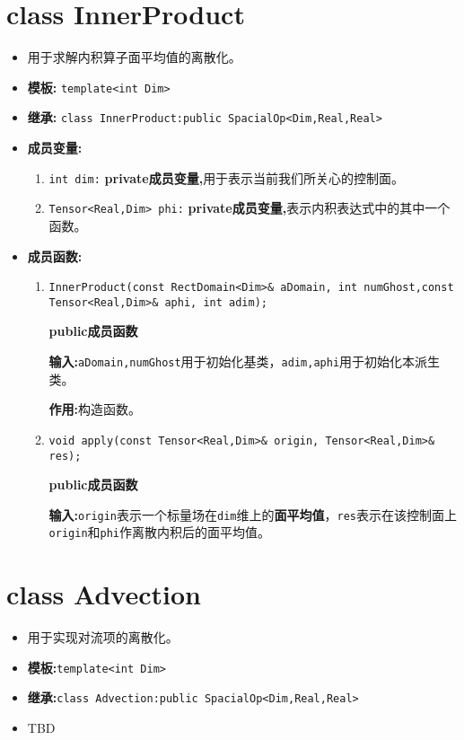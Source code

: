\documentclass[UTF8]{ctexart}
\theoremstyle{plain}
\theoremstyle{definition}
\theoremstyle{remark}
\begin{document}
\section{class InnerProduct}
\begin{itemize}
    \item 用于求解内积算子面平均值的离散化。
    \item \textbf{模板:} \texttt{template<int Dim>}
    \item \textbf{继承:} \texttt{class InnerProduct:public SpacialOp<Dim,Real,Real>}
    \item \textbf{成员变量:}
    \begin{enumerate}
        \item \texttt{int dim:} \textbf{private成员变量,}用于表示当前我们所关心的控制面。
        \item \texttt{Tensor<Real,Dim> phi:} \textbf{private成员变量,}表示内积表达式中的其中一个函数。
    \end{enumerate}
    \item \textbf{成员函数:}
    \begin{enumerate}
        \item \texttt{InnerProduct(const RectDomain<Dim>\& aDomain, int numGhost,const Tensor<Real,Dim>\& aphi, int adim);}
        
        \textbf{public成员函数}

        \textbf{输入:}\texttt{aDomain,numGhost}用于初始化基类，\texttt{adim,aphi}用于初始化本派生类。

        \textbf{作用:}构造函数。

        \item \texttt{void apply(const Tensor<Real,Dim>\& origin, Tensor<Real,Dim>\& res);}
        
        \textbf{public成员函数}

        \textbf{输入:}\texttt{origin}表示一个标量场在\texttt{dim}维上的\textbf{面平均值}，\texttt{res}表示在该控制面上\texttt{origin}和\texttt{phi}作离散内积后的面平均值。
    \end{enumerate}
\end{itemize}
\section{class Advection}
\begin{itemize}
    \item 用于实现对流项的离散化。
    \item \textbf{模板:}\texttt{template<int Dim>}
    \item \textbf{继承:}\texttt{class Advection:public SpacialOp<Dim,Real,Real>}
    \item TBD
\end{itemize}
\end{document}
